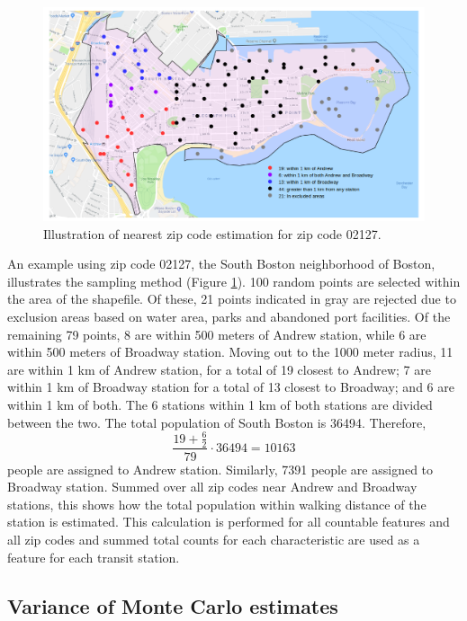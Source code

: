 \documentclass[11pt]{article}
\begin{document}
\begin{figure}
\begin{center}\includegraphics[scale=0.55]{geo_point_demonstration}\end{center}\caption{Illustration of nearest zip code estimation for zip code 02127.}\label{fig:f1}
\end{figure}


An example using zip code 02127, the South Boston neighborhood of Boston, illustrates the sampling method (Figure \ref{fig:f1}). 100 random points are selected within the area of the shapefile. Of these, 21 points indicated in gray are rejected due to exclusion areas based on water area, parks and abandoned port facilities. Of the remaining 79 points, 8 are within 500 meters of Andrew station, while 6 are within 500 meters of Broadway station. Moving out to the 1000 meter radius, 11 are within 1 km of Andrew station, for a total of 19 closest to Andrew; 7 are within 1 km of Broadway station for a total of 13 closest to Broadway; and 6 are within 1 km of both. The 6 stations within 1 km of both stations are divided between the two. The total population of South Boston is 36494. Therefore, $$\frac{19 + \frac{6}{2}}{79}\cdot{36494} = 10163$$ people are assigned to Andrew station. Similarly, 7391 people are assigned to Broadway station. Summed over all zip codes near Andrew and Broadway stations, this shows how the total population within walking distance of the station is estimated. This calculation is performed for all countable features and all zip codes and summed total counts for each characteristic are used as a feature for each transit station. 

\subsection{Variance of Monte Carlo estimates}
\end{document}
